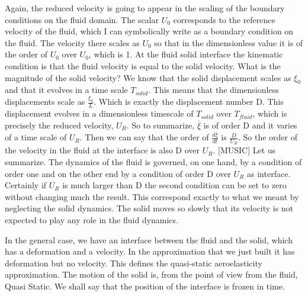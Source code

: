 \documentclass{article}
\begin{document}
Again, the reduced velocity is going to
appear in the scaling of the boundary conditions on the fluid domain. The scalar $U_0$ corresponds to
the reference velocity of the fluid, which I can symbolically write as
a boundary condition on the fluid. The velocity there scales as $U_0$ so
that in the dimensionless value it is of the order of $U_0$
over $U_0$, which is 1. At the fluid solid interface
the kinematic condition is that the fluid velocity is
equal to the solid velocity. What is the magnitude
of the solid velocity? We know that the solid displacement
scales as 
$\xi_0$ and that it evolves  in a time scale 
$T_{solid}$. This means that the dimensionless displacements scale as 
$\frac{\xi_0}{L}$. Which is exactly
the displacement number D. This displacement evolves in a dimensionless
timescale of $T_{solid}$ over $T_{fluid}$, which is precisely the reduced velocity,
$U_R$. So to summarize, $\overline{\xi}$ is of order D and it varies of a time scale of $U_R$. Then we can say that the order of 
$\frac{d\overline{\xi}}{dt}$   is $\frac{D}{U_R}$. So the order of the velocity in the fluid at the interface is also D over $U_R$. [MUSIC] Let us summarize. The dynamics of the fluid is governed, on
one hand, by a condition of order one and on the other end by a condition
of order D over $U_R$ as interface. Certainly if $U_R$ is much
larger than D the second condition can be set to zero
without changing much the result. This correspond exactly to what we
meant by neglecting the solid dynamics. The solid moves so
slowly that its velocity is not expected to play any role in the fluid dynamics. 

 In the general case, we have an interface
between the fluid and the solid, which has a deformation and a velocity. In the approximation that we just built
it has deformation but no velocity. This defines the quasi-static
aeroelasticity approximation. The motion of the solid is, from the point
of view from the fluid, Quasi Static. We shall say that the position of
the interface is frozen in time. 
\end{document}
